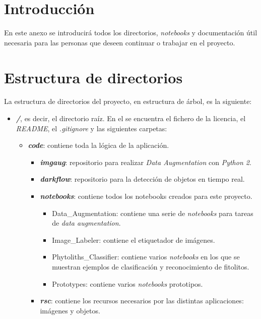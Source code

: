 
\section{Introducción}
En este anexo se introducirá todos los directorios, \textit{notebooks} y documentación útil necesaria para las personas que deseen continuar o trabajar en el proyecto.

\section{Estructura de directorios}
La estructura de directorios del proyecto, en estructura de árbol, es la siguiente:

\begin{itemize}
	\item \textit{\textbf{/}}, es decir, el directorio raíz. En el se encuentra el fichero de la licencia, el \textit{README}, el \textit{.gitignore} y las siguientes carpetas:
	\begin{itemize}
		\item \textit{\textbf{code}}: contiene toda la lógica de la aplicación.
			\begin{itemize}
				\item \textit{\textbf{imgaug}}: repositorio para realizar \textit{Data Augmentation} con \textit{Python 2}.
				\item \textit{\textbf{darkflow}}: repositorio para la detección de objetos en tiempo real.
				\item \textit{\textbf{notebooks}}: contiene todos los notebooks creados para este proyecto.
				\begin{itemize}
					\item Data\_Augmentation: contiene una serie de \textit{notebooks} para tareas de \textit{data augmentation}.
					\item Image\_Labeler: contiene el etiquetador de imágenes.
					\item Phytoliths\_Classifier: contiene varios \textit{notebooks} en los que se muestran ejemplos de clasificación y reconocimiento de fitolitos.
					\item Prototypes: contiene varios \textit{notebooks} prototipos.
				\end{itemize}
				\item \textit{\textbf{rsc}}: contiene los recursos necesarios por las distintas aplicaciones: imágenes y objetos. 
			\end{itemize}

\end{itemize}
\end{itemize}
